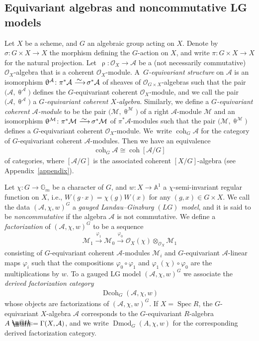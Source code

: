 \documentclass[pdftex]{sigma}%
\makeatletter
\newcommand*{\defeq}{\mathrel{\rlap{%
 \raisebox{0.3ex}{$\m@th\cdot$}}%
 \raisebox{-0.3ex}{$\m@th\cdot$}}%
 =}
\numberwithin{equation}{section}
\newcommand{\Dmod}{\operatorname{Dmod}}
\newcommand{\Dcoh}{\operatorname{Dcoh}}
\newcommand{\Spec}{\operatorname{Spec}}
\newcommand{\coh}{\operatorname{coh}}
\newcommand{\cA}{\mathcal{A}}
\newcommand{\cM}{\mathcal{M}}
\newcommand{\cO}{\mathcal{O}}
\newcommand{\bA}{\mathbb{A}}
\newcommand{\bG}{\mathbb{G}}
\newcommand{\simto}{\,\,\,\,\raisebox{4pt}{$\sim$}{\kern -1.1em \longrightarrow}\,}
\makeatother
\begin{document}
\subsection{Equivariant algebras and noncommutative LG models}

Let $X$ be a scheme, and $G$ an algebraic group acting on $X$. Denote by $\sigma\colon G\times X\to X$ the morphism defining the $G$-action on $X$, and write $\pi\colon G\times X\to X$ for the natural projection. Let~$\uprho\colon \cO_X\to\cA$ be a (not necessarily commutative) $\cO_X$-algebra that is a coherent $\cO_X$-module. A~{\it $G$-equivariant structure} on $\cA$ is an isomorphism $\uptheta^{\cA}\colon\pi^*\cA\simto\sigma^*\cA$ of sheaves of $\cO_{G\times X}$-algebras such that the pair $\big(\cA,\uptheta^{\cA}\big)$ defines the $G$-equivariant coherent $\cO_X$-module, and we call the pair $\big(\cA,\uptheta^{\cA}\big)$ a {\it $G$-equivariant coherent $X$-algebra}. Similarly, we define a {\it $G$-equivariant coherent $\cA$-module} to be the pair $\big(\cM,\uptheta^{\cM}\big)$ of a right $\cA$-module $\cM$ and an isomorphism $\uptheta^{\cM}\colon\pi^*\cM\simto\sigma^*\cM$ of $\pi^*\cA$-modules such that the pair $\big(\cM,\uptheta^{\cM}\big)$ defines a $G$-equivariant coherent $\cO_X$-module. We~write $\coh_G\cA$ for the category of $G$-equivariant coherent $\cA$-modules. Then we have an equivalence
\begin{gather*}
\coh_G\cA\cong\coh[\cA/G]
\end{gather*}
of categories, where $[\cA/G]$ is the associated coherent $[X/G]$-algebra (see Appendix~\ref{appendix}).

Let $\chi\colon G\to \bG_m$ be a character of $G$, and $w\colon X\to \bA^1$ a $\chi$-semi-invariant regular function on $X$, i.e., $W(g\cdot x)=\chi(g)W(x)$ for any $(g,x)\in G\times X$. We call the data $(\cA,\chi,w)^G$ a {\it gauged Landau--Ginzburg $(LG)$ model}, and it is said to be {\it noncommutative} if the algebra $\cA$ is not commutative. We define a {\it factorization} of $(\cA,\chi,w)^G$ to be a sequence
\begin{gather*}
\cM_1\xrightarrow{\varphi_1}\cM_0\xrightarrow{\varphi_0}\cO_X(\chi)\otimes_{\cO_X}\cM_1
\end{gather*}
consisting of $G$-equivariant coherent $\cA$-modules $\cM_i$ and $G$-equivariant $\cA$-linear maps $\varphi_i$ such that the compositions $\varphi_0\circ \varphi_1$ and $\varphi_1(\chi)\circ\varphi_0$ are the multiplications by $w$.
To a gauged LG model $(\cA,\chi,w)^G$ we associate the {\it derived factorization category}
\begin{gather*}
\Dcoh_G(\cA,\chi,w)
\end{gather*}
whose objects are factorizations of $(\cA,\chi,w)^G$. If $X=\Spec R$, the $G$-equivariant $X$-algebra $\cA$ corresponds to the $G$-equivariant $R$-algebra $A\defeq\Gamma(X,\cA)$, and we write $\Dmod_G(A,\chi,w)$ for the corresponding derived factorization category.
\end{document}
